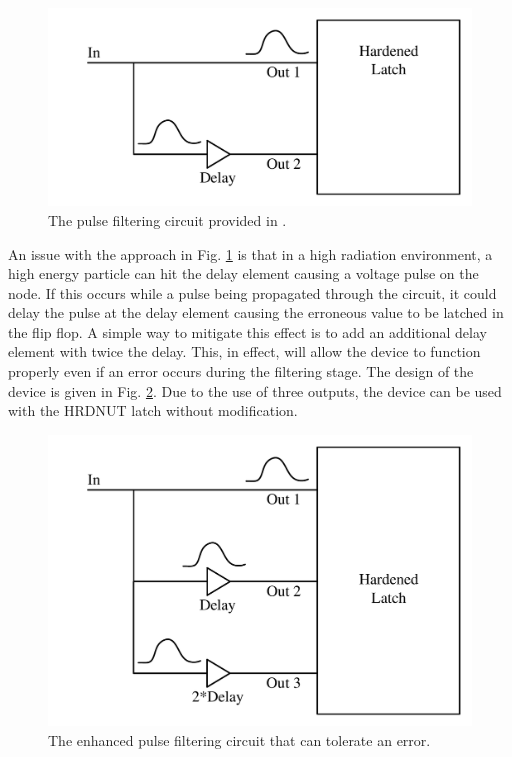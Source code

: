 \begin{figure}[!htbp]
	\centering
	\includegraphics[width=0.65\linewidth]{Figures/PulseFilter}
	\caption{The pulse filtering circuit provided in \cite{FERST}.}
	\label{P_filter}
\end{figure}

An issue with the approach in Fig. \ref{P_filter} is that in a high radiation environment, a high energy particle can hit the delay element causing a voltage pulse on the node. If this occurs while a pulse being propagated through the circuit, it could delay the pulse at the delay element causing the erroneous value to be latched in the flip flop. A simple way to mitigate this effect is to add an additional delay element with twice the delay. This, in effect, will allow the device to function properly even if an error occurs during the filtering stage. The design of the device is given in Fig. \ref{Enh_filter}. Due to the use of three outputs, the device can be used with the HRDNUT latch without modification.

\begin{figure}[!htbp]
	\centering
	\includegraphics[width=0.65\linewidth]{Figures/PulseFilterEnh}
	\caption{The enhanced pulse filtering circuit that can tolerate an error.}
	\label{Enh_filter}
\end{figure} 

